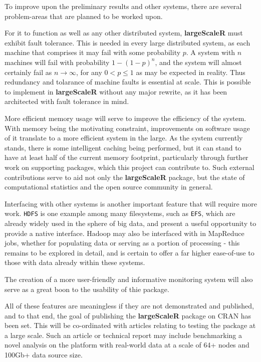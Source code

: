 To improve upon the preliminary results and other systems, there are several problem-areas that are planned to be worked upon.

For it to function as well as any other distributed system, \textbf{largeScaleR} must exhibit fault tolerance.
This is needed in every large distributed system, as each machine that comprises it may fail with some probability \(p\).
A system with \(n\) machines will fail with probability \(1-(1-p)^n\), and the system will almost certainly fail as \(n \to \infty\), for any \(0 < p \leq 1\) as may be expected in reality.
Thus redundancy and tolarance of machine faults is essential at scale.
This is possible to implement in \textbf{largeScaleR} without any major rewrite, as it has been architected with fault tolerance in mind.

More efficient memory usage will serve to improve the efficiency of the system.
With memory being the motivating constraint, improvements on software usage of it translate to a more efficient system in the large.
As the system currently stands, there is some intelligent caching being performed, but it can stand to have at least half of the current memory footprint, particularly through further work on supporting packages, which this project can contribute to.
Such external contributions serve to aid not only the \textbf{largeScaleR} package, but the state of computational statistics and the open source community in general.

Interfacing with other systems is another important feature that will require more work.
\texttt{HDFS} is one example among many filesystems, such as \texttt{EFS}, which are already widely used in the sphere of big data, and present a useful opportunity to provide a native interface.
Hadoop may also be interfaced with in MapReduce jobs, whether for populating data or serving as a portion of processing - this remains to be explored in detail, and is certain to offer a far higher ease-of-use to those with data already within these systems.

The creation of a more user-friendly and informative monitoring system will also serve as a great boon to the usability of thie package.

All of these features are meaningless if they are not demonstrated and published, and to that end, the goal of publishing the \textbf{largeScaleR} package on CRAN has been set.
This will be co-ordinated with articles relating to testing the package at a large scale.
Such an article or technical report may include benchmarking a novel analysis on the platform with real-world data at a scale of 64+ nodes and 100Gb+ data source size.
